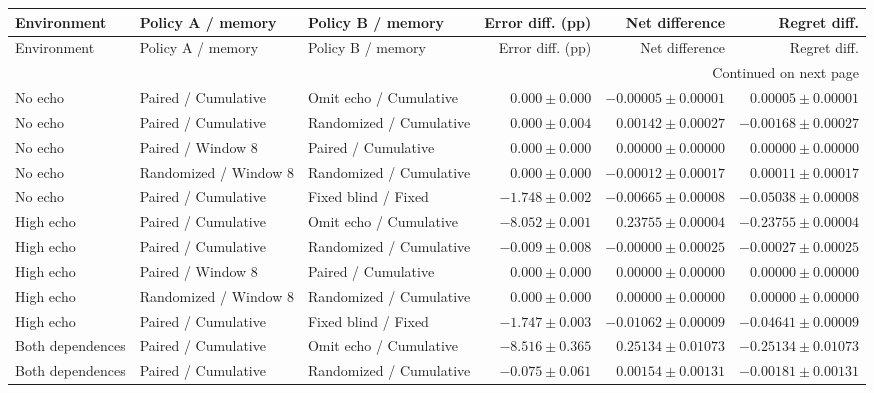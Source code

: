 \begin{longtable}{@{}l>{\raggedright\arraybackslash}p{.175\linewidth}>{\raggedright\arraybackslash}p{.175\linewidth}rrr@{}}
\toprule Environment & Policy A / memory & Policy B / memory & Error diff. (pp) & Net difference & Regret diff. \\\midrule\endfirsthead
\toprule Environment & Policy A / memory & Policy B / memory & Error diff. (pp) & Net difference & Regret diff. \\\midrule\endhead
\midrule\multicolumn{6}{r}{Continued on next page}\\\endfoot
\bottomrule\endlastfoot
No echo & Paired / Cumulative & Omit echo / Cumulative & $0.000 \pm 0.000$ & $-0.00005 \pm 0.00001$ & $0.00005 \pm 0.00001$ \\
No echo & Paired / Cumulative & Randomized / Cumulative & $0.000 \pm 0.004$ & $0.00142 \pm 0.00027$ & $-0.00168 \pm 0.00027$ \\
No echo & Paired / Window 8 & Paired / Cumulative & $0.000 \pm 0.000$ & $0.00000 \pm 0.00000$ & $0.00000 \pm 0.00000$ \\
No echo & Randomized / Window 8 & Randomized / Cumulative & $0.000 \pm 0.000$ & $-0.00012 \pm 0.00017$ & $0.00011 \pm 0.00017$ \\
No echo & Paired / Cumulative & Fixed blind / Fixed & $-1.748 \pm 0.002$ & $-0.00665 \pm 0.00008$ & $-0.05038 \pm 0.00008$ \\
High echo & Paired / Cumulative & Omit echo / Cumulative & $-8.052 \pm 0.001$ & $0.23755 \pm 0.00004$ & $-0.23755 \pm 0.00004$ \\
High echo & Paired / Cumulative & Randomized / Cumulative & $-0.009 \pm 0.008$ & $-0.00000 \pm 0.00025$ & $-0.00027 \pm 0.00025$ \\
High echo & Paired / Window 8 & Paired / Cumulative & $0.000 \pm 0.000$ & $0.00000 \pm 0.00000$ & $0.00000 \pm 0.00000$ \\
High echo & Randomized / Window 8 & Randomized / Cumulative & $0.000 \pm 0.000$ & $0.00000 \pm 0.00000$ & $0.00000 \pm 0.00000$ \\
High echo & Paired / Cumulative & Fixed blind / Fixed & $-1.747 \pm 0.003$ & $-0.01062 \pm 0.00009$ & $-0.04641 \pm 0.00009$ \\
Both dependences & Paired / Cumulative & Omit echo / Cumulative & $-8.516 \pm 0.365$ & $0.25134 \pm 0.01073$ & $-0.25134 \pm 0.01073$ \\
Both dependences & Paired / Cumulative & Randomized / Cumulative & $-0.075 \pm 0.061$ & $0.00154 \pm 0.00131$ & $-0.00181 \pm 0.00131$ \\

\end{longtable}
